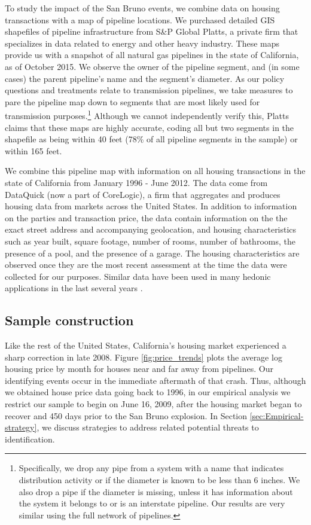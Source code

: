 \documentclass[12pt]{article}
\begin{document}
To study the impact of the San Bruno events, we combine data on housing
transactions with a map of pipeline locations. We purchased detailed
GIS shapefiles of pipeline infrastructure from S\&P Global Platts,
a private firm that specializes in data related to energy and other
heavy industry. These maps provide us with a snapshot of all natural
gas pipelines in the state of California, as of October 2015. We observe
the owner of the pipeline segment, and (in some cases) the parent
pipeline's name and the segment's diameter. As our policy questions
and treatments relate to transmission pipelines, we take measures
to pare the pipeline map down to segments that are most likely used
for transmission purposes.\footnote{Specifically, we drop any pipe from a system with a name that indicates
distribution activity or if the diameter is known to be less than
6 inches. We also drop a pipe if the diameter is missing, unless it
has information about the system it belongs to or is an interstate
pipeline. Our results are very similar using the full network of pipelines.
} Although we cannot independently verify this, Platts claims that
these maps are highly accurate, coding all but two segments in the
shapefile as being within 40 feet (78\% of all pipeline segments in
the sample) or within 165 feet.

We combine this pipeline map with information on all housing transactions
in the state of California from January 1996 - June 2012. The data
come from DataQuick (now a part of CoreLogic), a firm that aggregates
and produces housing data from markets across the United States. In
addition to information on the parties and transaction price, the
data contain information on the the exact street address and accompanying
geolocation, and housing characteristics such as year built, square
footage, number of rooms, number of bathrooms, the presence of a pool,
and the presence of a garage. The housing characteristics are observed
once \textendash{} they are the most recent assessment at the time
the data were collected for our purposes. Similar data have been used
in many hedonic applications in the last several years \citep[e.g.,][]{muehlenbachs_housing_2015}.

\subsection{Sample construction \label{subsec:Sample-construction}}

Like the rest of the United States, California's housing market experienced
a sharp correction in late 2008. Figure \ref{fig:price_trends} plots
the average log housing price by month for houses near and far away
from pipelines. Our identifying events occur in the immediate aftermath
of that crash. Thus, although we obtained house price data going back
to 1996, in our empirical analysis we restrict our sample to begin
on June 16, 2009, after the housing market began to recover and 450
days prior to the San Bruno explosion. In Section \ref{sec:Empirical-strategy},
we discuss strategies to address related potential threats to identification.
\end{document}
